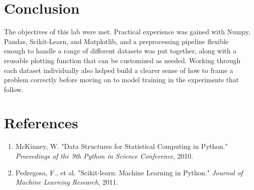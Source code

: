 \documentclass[12pt,a4paper]{article}
\begin{document}
\section{Conclusion}
The objectives of this lab were met. Practical experience was gained with Numpy, Pandas, Scikit-Learn, and Matplotlib, and a preprocessing pipeline flexible enough to handle a range of different datasets was put together, along with a reusable plotting function that can be customized as needed. Working through each dataset individually also helped build a clearer sense of how to frame a problem correctly before moving on to model training in the experiments that follow.

\section{References}
\begin{enumerate}
    \item McKinney, W. "Data Structures for Statistical Computing in Python." \textit{Proceedings of the 9th Python in Science Conference}, 2010.
    \item Pedregosa, F., et al. "Scikit-learn: Machine Learning in Python." \textit{Journal of Machine Learning Research}, 2011.
\end{enumerate}
\end{document}
